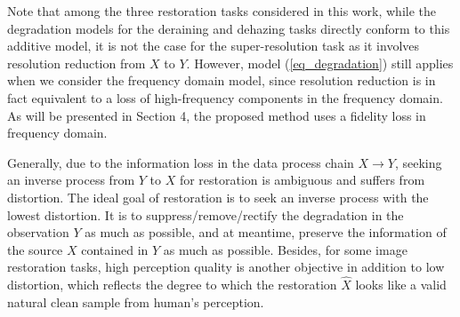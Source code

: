 \documentclass[10pt,journal,compsoc]{IEEEtran}
\begin{document}
Note that among the three restoration tasks considered 
in this work, while the degradation models 
for the deraining and dehazing tasks
directly conform to this additive model,
it is not the case for the super-resolution task as it
involves resolution reduction from $X$ to $Y$.
However, model (\ref{eq_degradation}) still applies
when we consider the frequency domain model, since  
resolution reduction is in fact equivalent to a loss of 
high-frequency components in the frequency domain.
As will be presented in Section 4, 
the proposed method uses a fidelity loss in frequency domain.

Generally, due to the information loss in the data 
process chain $X\rightarrow Y$,
seeking an inverse process from $Y$ to $X$ for 
restoration is ambiguous and suffers from distortion.
The ideal goal of restoration 
is to seek an inverse process with the lowest distortion.
It is to suppress/remove/rectify the degradation in the 
observation $Y$ as much as possible, and at meantime, 
preserve the information of the source $X$ contained in $Y$ as much as possible.
Besides, for some image restoration tasks,
high perception quality is another objective in addition to low distortion,
which reflects the degree to which the restoration $\hat X$ looks like 
a valid natural clean sample from human’s perception.
\end{document}
